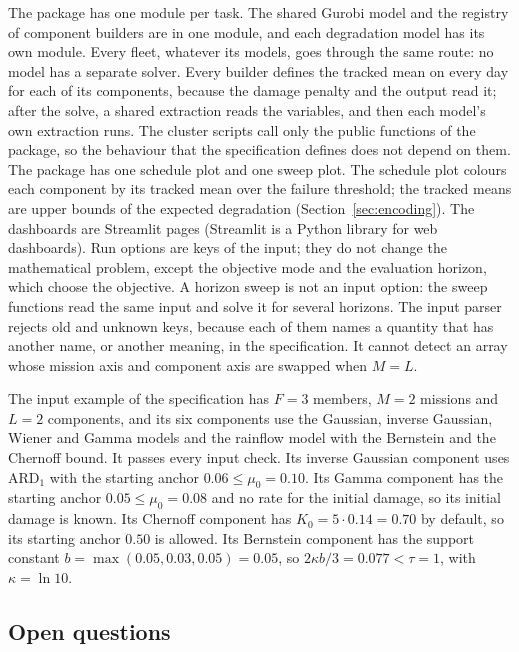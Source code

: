 \documentclass[11pt,a4paper]{article}
\theoremstyle{plain}
\theoremstyle{definition}
\theoremstyle{remark}
\begin{document}
The package has one module per task.
The shared Gurobi model and the registry of component builders are in one module, and each degradation model has its own module.
Every fleet, whatever its models, goes through the same route: no model has a separate solver.
Every builder defines the tracked mean on every day for each of its components, because the damage penalty and the output read it; after the solve, a shared extraction reads the variables, and then each model's own extraction runs.
The cluster scripts call only the public functions of the package, so the behaviour that the specification defines does not depend on them.
The package has one schedule plot and one sweep plot.
The schedule plot colours each component by its tracked mean over the failure threshold; the tracked means are upper bounds of the expected degradation (Section~\ref{sec:encoding}).
The dashboards are Streamlit pages (Streamlit is a Python library for web dashboards).
Run options are keys of the input; they do not change the mathematical problem, except the objective mode and the evaluation horizon, which choose the objective.
A horizon sweep is not an input option: the sweep functions read the same input and solve it for several horizons.
The input parser rejects old and unknown keys, because each of them names a quantity that has another name, or another meaning, in the specification.
It cannot detect an array whose mission axis and component axis are swapped when $M = L$.

The input example of the specification has $F = 3$ members, $M = 2$ missions and $L = 2$ components, and its six components use the Gaussian, inverse Gaussian, Wiener and Gamma models and the rainflow model with the Bernstein and the Chernoff bound.
It passes every input check.
Its inverse Gaussian component uses $\text{ARD}_1$ with the starting anchor $0.06 \le \mu_0 = 0.10$.
Its Gamma component has the starting anchor $0.05 \le \mu_0 = 0.08$ and no rate for the initial damage, so its initial damage is known.
Its Chernoff component has $K_0 = 5 \cdot 0.14 = 0.70$ by default, so its starting anchor $0.50$ is allowed.
Its Bernstein component has the support constant $b = \max(0.05, 0.03, 0.05) = 0.05$, so $2\kappa b/3 = 0.077 < \tau = 1$, with $\kappa = \ln 10$.

\subsection{Open questions}
\label{sec:open_questions}
\end{document}
